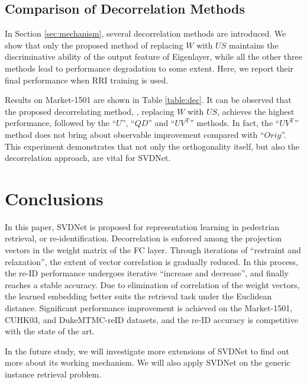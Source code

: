 \documentclass[10pt,twocolumn,letterpaper]{article}
\begin{document}
\subsection{Comparison of Decorrelation Methods} In Section \ref{sec:mechanism}, several decorrelation methods are introduced. 
We show that only the proposed method of replacing $W$ with $US$ maintains the discriminative ability of the output feature of Eigenlayer, while all the other three methods lead to performance degradation to some extent. Here, we report their final performance when RRI training is used. 


Results on Market-1501 are shown in Table \ref{table:dec}. It can be observed that the proposed decorrelating method, \ie, replacing $W$ with $US$, achieves the highest performance, followed by the ``$U$'', ``$QD$'' and ``$UV^\mathrm{T}$'' methods. In fact, the ``$UV^\mathrm{T}$'' method  does not bring about  observable improvement compared with ``$Orig$''. This experiment demonstrates that not only the orthogonality itself, but also the decorrelation approach, are vital for SVDNet.

\section{Conclusions}
In this paper, SVDNet is proposed for representation learning in pedestrian retrieval, or re-identification. Decorrelation is enforced among the projection vectors in the weight matrix of the FC layer. Through iterations of ``restraint and relaxation'', the extent of vector correlation is gradually reduced. In this process, the re-ID performance undergoes iterative ``increase and decrease'', and finally reaches a stable accuracy. Due to elimination of correlation of the weight vectors, the learned embedding better suits the retrieval task under the Euclidean distance. Significant performance improvement is achieved on the Market-1501, CUHK03, and DukeMTMC-reID datasets, and the re-ID accuracy is competitive with the state of the art.

In the future study, we will investigate more extensions of SVDNet to find out more about its working mechanism. We will also apply SVDNet on the generic instance retrieval problem.



{\small


}
\end{document}
